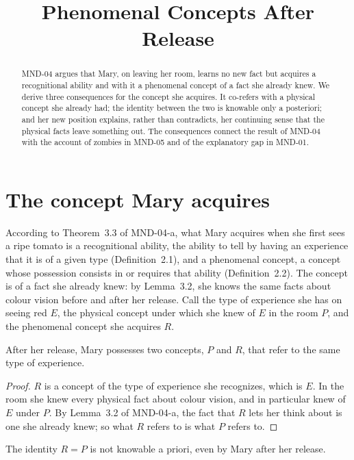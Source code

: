\documentclass{situationist-preprint}
\title{Phenomenal Concepts After Release}
\begin{document}
\maketitle

\begin{abstract}
MND-04 argues that Mary, on leaving her room, learns no new fact but acquires a recognitional ability and with it a phenomenal concept of a fact she already knew. We derive three consequences for the concept she acquires. It co-refers with a physical concept she already had; the identity between the two is knowable only a posteriori; and her new position explains, rather than contradicts, her continuing sense that the physical facts leave something out. The consequences connect the result of MND-04 with the account of zombies in MND-05 and of the explanatory gap in MND-01.
\end{abstract}

\section{The concept Mary acquires}

According to Theorem~3.3 of MND-04-a, what Mary acquires when she first sees a ripe tomato is a recognitional ability, the ability to tell by having an experience that it is of a given type (Definition~2.1), and a phenomenal concept, a concept whose possession consists in or requires that ability (Definition~2.2). The concept is of a fact she already knew: by Lemma~3.2, she knows the same facts about colour vision before and after her release. Call the type of experience she has on seeing red $E$, the physical concept under which she knew of $E$ in the room $P$, and the phenomenal concept she acquires $R$.

\begin{proposition}\label{p:coref}
After her release, Mary possesses two concepts, $P$ and $R$, that refer to the same type of experience.
\end{proposition}

\begin{proof}
$R$ is a concept of the type of experience she recognizes, which is $E$. In the room she knew every physical fact about colour vision, and in particular knew of $E$ under $P$. By Lemma~3.2 of MND-04-a, the fact that $R$ lets her think about is one she already knew; so what $R$ refers to is what $P$ refers to.
\end{proof}

\begin{proposition}\label{p:apost}
The identity $R = P$ is not knowable a priori, even by Mary after her release.
\end{proposition}
\end{document}
